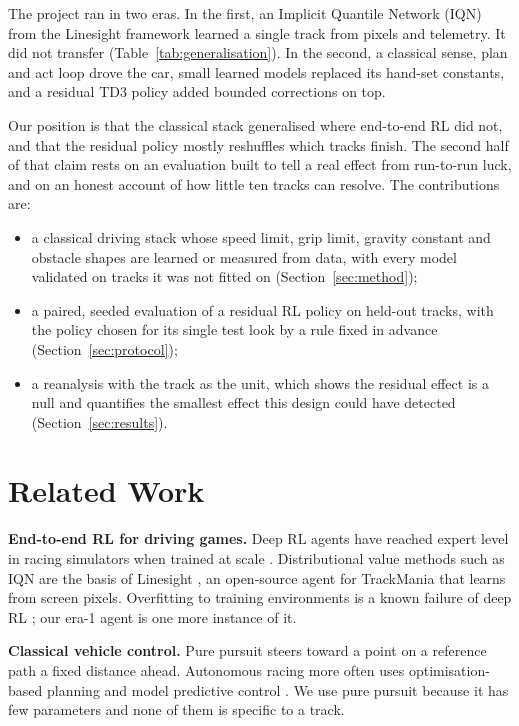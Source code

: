 \documentclass[conference]{IEEEtran}
\begin{document}
The project ran in two eras. In the first, an Implicit Quantile Network (IQN) \cite{dabney2018iqn} from the
Linesight framework \cite{linesight} learned a single track from pixels and telemetry. It did not transfer
(Table~\ref{tab:generalisation}). In the second, a classical sense, plan and act loop drove the car, small
learned models replaced its hand-set constants, and a residual TD3 policy
\cite{fujimoto2018td3,silver2018residual,johannink2019residual} added bounded corrections on top.

Our position is that the classical stack generalised where end-to-end RL did not, and that the residual policy
mostly reshuffles which tracks finish. The second half of that claim rests on an evaluation built to tell a
real effect from run-to-run luck, and on an honest account of how little ten tracks can resolve. The
contributions are:
\begin{itemize}
\item a classical driving stack whose speed limit, grip limit, gravity constant and obstacle shapes are
  learned or measured from data, with every model validated on tracks it was not fitted on
  (Section~\ref{sec:method});
\item a paired, seeded evaluation of a residual RL policy on held-out tracks, with the policy chosen for its
  single test look by a rule fixed in advance (Section~\ref{sec:protocol});
\item a reanalysis with the track as the unit, which shows the residual effect is a null and quantifies the
  smallest effect this design could have detected (Section~\ref{sec:results}).
\end{itemize}

\section{Related Work}

\textbf{End-to-end RL for driving games.} Deep RL agents have reached expert level in racing simulators when
trained at scale \cite{wurman2022gtsophy}. Distributional value methods such as IQN \cite{dabney2018iqn} are the
basis of Linesight \cite{linesight}, an open-source agent for TrackMania that learns from screen pixels.
Overfitting to training environments is a known failure of deep RL \cite{cobbe2019quantifying}; our era-1
agent is one more instance of it.

\textbf{Classical vehicle control.} Pure pursuit \cite{coulter1992purepursuit} steers toward a point on a
reference path a fixed distance ahead. Autonomous racing more often uses optimisation-based planning and
model predictive control \cite{betz2022racingsurvey,liniger2015racing}. We use pure pursuit because it has few
parameters and none of them is specific to a track.
\end{document}
